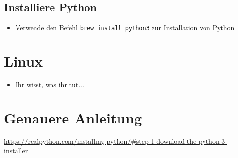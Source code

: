 \documentclass[accentcolor=tud3c,colorbacktitle,12pt]{tudexercise}
\begin{document}
\subsection*{Installiere Python}
\begin{itemize}
	\item Verwende den Befehl \texttt{brew install python3} zur Installation von Python
\end{itemize}

\section*{Linux}
\begin{itemize}
	\item Ihr wisst, was ihr tut...
\end{itemize}

\section*{Genauere Anleitung}
 \url{https://realpython.com/installing-python/#step-1-download-the-python-3-installer}
\end{document}
